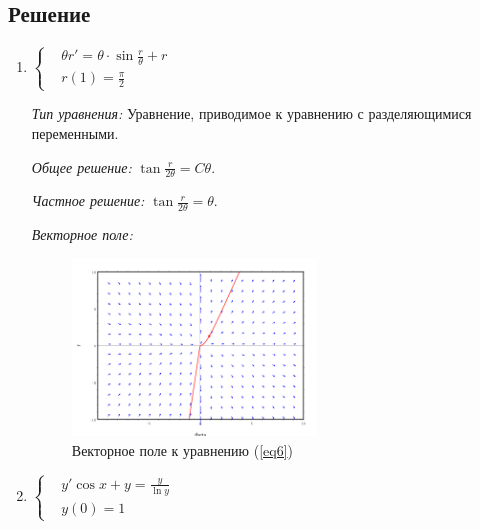 \documentclass[14pt, a4paper, titlepage, fleqn]{extarticle}
\begin{document}
        \subsection{Решение}

            \begin{enumerate}
                \item
                \(
                    \left\lbrace
                    \begin{aligned}
                        &\theta r' = \theta \cdot \sin{\frac{r}{\theta}} + r \\
                        &r(1) = \frac{\pi}{2}
                    \end{aligned}
                    \right.
                \)
                \label{eq6}

                \textit{Тип уравнения:}
                Уравнение, приводимое к уравнению с разделяющимися переменными.

                \textit{Общее решение:}
                \(
                    \displaystyle
                    \tan{\frac{r}{2\theta}} = C \theta.
                \)

                \textit{Частное решение:}
                \(
                    \displaystyle
                    \tan{\frac{r}{2\theta}} = \theta.
                \)

                \textit{Векторное поле:}

                \begin{figure}[H]
                    \centering
                    \includegraphics[width=6.5cm]{pictures/vector_field_6.pdf}
                    \caption{Векторное поле к уравнению (\ref{eq6})}
                \end{figure}

                \item 
                \(
                    \left\lbrace
                    \begin{aligned}
                        &y' \cos{x} + y = \frac{y}{\ln{y}} \\
                        &y(0) = 1 
                    \end{aligned}
                    \right.
                \)
                \label{eq7}


\end{enumerate}
\end{document}
